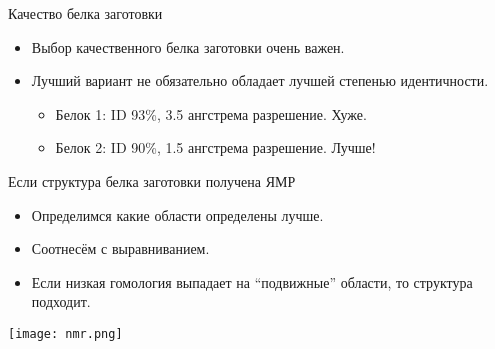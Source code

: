 \begin{frame}
{Качество белка заготовки}
	\begin{itemize}
		 \item 
			 Выбор качественного белка заготовки очень важен.
		 \item
			 Лучший вариант не обязательно обладает лучшей степенью идентичности.
			 \begin{itemize}
		        \item
			  Белок 1: ID 93\%, 3.5 ангстрема разрешение. Хуже.
		        \item
			  Белок 2: ID 90\%, 1.5 ангстрема разрешение. Лучше!
		     \end{itemize}
	\end{itemize}
\end{frame}
\begin{frame}
{Если структура белка заготовки получена ЯМР}
	\begin{itemize}
		\item
			 Определимся какие области определены лучше. 
		 \item
			  Соотнесём с выравниванием.
		  \item
			   Если низкая гомология выпадает на “подвижные” области, то структура подходит.
	\end{itemize}
	\begin{center}
	\texttt{[image: nmr.png]}
	\end{center}
\end{frame}
